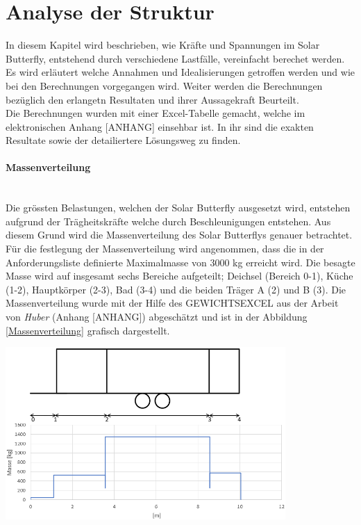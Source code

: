 \section{Analyse der Struktur}
In diesem Kapitel wird beschrieben, wie Kräfte und Spannungen im Solar Butterfly, entstehend durch verschiedene Lastfälle, vereinfacht berechet werden. Es wird erläutert welche Annahmen und Idealisierungen getroffen werden und wie bei den Berechnungen vorgegangen wird. Weiter werden die Berechnungen bezüglich den erlangetn Resultaten und ihrer Aussagekraft Beurteilt.\\
Die Berechnungen wurden mit einer Excel-Tabelle gemacht, welche im elektronischen Anhang [ANHANG] einsehbar ist. In ihr sind die exakten Resultate sowie der detailiertere Lösungsweg zu finden.

\paragraph{Massenverteilung}\mbox{}\\
Die grössten Belastungen, welchen der Solar Butterfly ausgesetzt wird, entstehen aufgrund der Trägheitskräfte welche durch Beschleunigungen entstehen. Aus diesem Grund wird die Massenverteilung des Solar Butterflys genauer betrachtet. Für die festlegung der Massenverteilung wird angenommen, dass die in der Anforderungsliste definierte Maximalmasse von 3000 kg erreicht wird. Die besagte Masse wird auf insgesamt sechs Bereiche aufgeteilt; Deichsel (Bereich 0-1), Küche (1-2), Hauptkörper (2-3), Bad (3-4) und die beiden Träger A (2) und B (3). Die Massenverteilung wurde mit der Hilfe des GEWICHTSEXCEL aus der Arbeit von \emph{Huber} (Anhang [ANHANG]) abgeschätzt und ist in der Abbildung \ref{Massenverteilung} grafisch dargestellt.

\begin{center}
  \includegraphics[width=0.8\textwidth]{04_Figures/Massenverteilung.png}
  \label{Massenverteilung}
\end{center}

